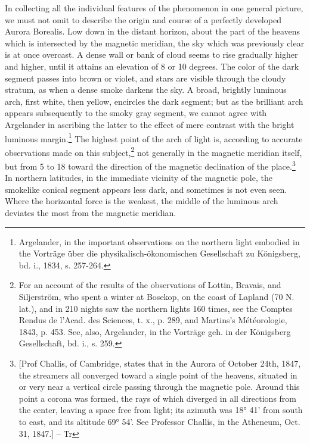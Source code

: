 In collecting all the individual features of the phenomenon in one general picture, we must not omit to describe the origin and course of a perfectly developed Aurora Borealis. Low down in the distant horizon, about the part of the heavens which is intersected by the magnetic meridian, the sky which was previously clear is at once overcast. A dense wall or bank of cloud seems to rise gradually higher and higher, until it attains an elevation of 8 or 10 degrees. The color of the dark segment passes into brown or violet, and stars are visible through the cloudy stratum, as when a dense smoke darkens the sky. A broad, brightly luminous arch, first white, then yellow, encircles the dark segment; but as the brilliant arch appears subsequently to the smoky gray segment, we cannot agree with Argelander in ascribing the latter to the effect of mere contrast with the bright luminous margin.\footnote{Argelander, in the important observations on the northern light embodied in the Vorträge über die physikalisch-ökonomischen Gesellschaft zu Königsberg, bd. i., 1834, s. 257-264.} The highest point of the arch of light is, according to accurate observations made on this subject,\footnote{For an account of the results of the observations of Lottin, Bravais, and Siljerström, who spent a winter at Bosekop, on the coast of Lapland (70 N. lat.), and in 210 nights saw the northern lights 160 times, see the Comptes Rendus de l'Acad. des Sciences, t. x., p. 289, and Martins's Météorologie, 1843, p. 453. See, also, Argelander, in the Vorträge geh. in der Königsberg Gesellschaft, bd. i., s. 259.} not generally in the magnetic meridian itself, but from 5 to 18 toward the direction of the magnetic declination of the place.\footnote{[Prof Challis, of Cambridge, states that in the Aurora of October 24th, 1847, the streamers all converged toward a single point of the heavens, situated in or very near a vertical circle passing through the magnetic pole. Around this point a corona was formed, the rays of which diverged in all directions from the center, leaving a space free from light; its azimuth was 18° 41' from south to east, and its altitude 69° 54'. See Professor Challis, in the Atheneum, Oct. 31, 1847.] -- Tr} In northern latitudes, in the immediate vicinity of the magnetic pole, the smokelike conical segment appears less dark, and sometimes is not even seen. Where the horizontal force is the weakest, the middle of the luminous arch deviates the most from the magnetic meridian.

